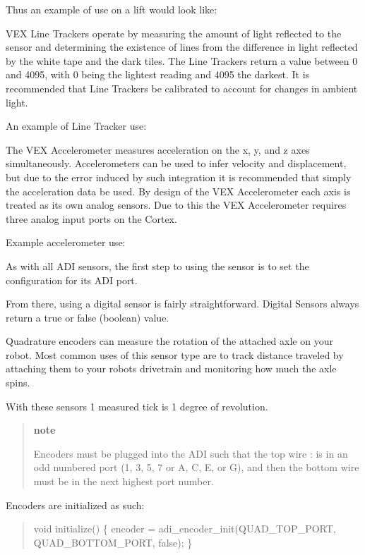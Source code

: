Thus an example of use on a lift would look like\+:

V\+EX Line Trackers operate by measuring the amount of light reflected to the sensor and determining the existence of lines from the difference in light reflected by the white tape and the dark tiles. The Line Trackers return a value between 0 and 4095, with 0 being the lightest reading and 4095 the darkest. It is recommended that Line Trackers be calibrated to account for changes in ambient light.

An example of Line Tracker use\+:

The V\+EX Accelerometer measures acceleration on the x, y, and z axes simultaneously. Accelerometers can be used to infer velocity and displacement, but due to the error induced by such integration it is recommended that simply the acceleration data be used. By design of the V\+EX Accelerometer each axis is treated as its own analog sensors. Due to this the V\+EX Accelerometer requires three analog input ports on the Cortex.

Example accelerometer use\+:

As with all A\+DI sensors, the first step to using the sensor is to set the configuration for its A\+DI port.

From there, using a digital sensor is fairly straightforward. Digital Sensors always return a true or false (boolean) value.

Quadrature encoders can measure the rotation of the attached axle on your robot. Most common uses of this sensor type are to track distance traveled by attaching them to your robots drivetrain and monitoring how much the axle spins.

With these sensors 1 measured tick is 1 degree of revolution.

\begin{quote}
{\bfseries note}

Encoders must be plugged into the A\+DI such that the top wire \+: is in an odd numbered port (1, 3, 5, 7 or \textquotesingle{}A\textquotesingle{}, \textquotesingle{}C\textquotesingle{}, \textquotesingle{}E\textquotesingle{}, or \textquotesingle{}G\textquotesingle{}), and then the bottom wire must be in the next highest port number.

\end{quote}
Encoders are initialized as such\+:

\begin{quote}

\begin{DoxyCode}
void initialize() \{
  encoder = adi\_encoder\_init(QUAD\_TOP\_PORT, QUAD\_BOTTOM\_PORT, false);
\}
\end{DoxyCode}
 \end{quote}


